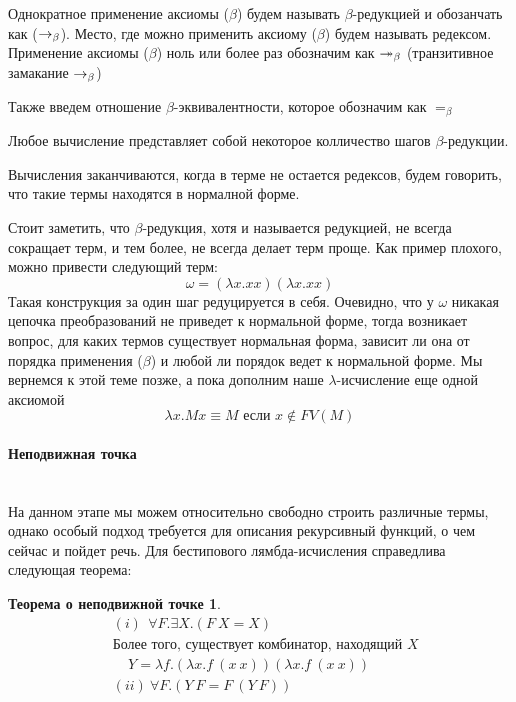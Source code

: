 \documentclass[lambda.tex]{subfiles}
\begin{document}
Однократное применение аксиомы ($\beta$) будем называть $\beta$-редукцией и обозанчать как ($\rightarrow_\beta$). Место, где можно применить аксиому ($\beta$) будем называть редексом. 
Применение аксиомы ($\beta$) ноль или более раз обозначим как $\twoheadrightarrow_\beta$ (транзитивное замакание $\rightarrow_\beta$)

Также введем отношение $\beta$-эквивалентности, которое обозначим как $=_\beta$

Любое вычисление представляет собой некоторое колличество шагов $\beta$-редукции.

Вычисления заканчиваются, когда в терме не остается редексов, будем говорить, что такие термы находятся в нормалной форме.

Стоит заметить, что $\beta$-редукция, хотя и называется редукцией, не всегда сокращает терм, и тем более, не всегда делает терм проще. Как пример плохого, можно привести следующий терм:
\begin{equation*}
	\omega = (\lambda x.xx)(\lambda x.xx)
\end{equation*}
Такая конструкция за один шаг редуцируется в себя. Очевидно, что у $\omega$ никакая цепочка преобразований не приведет к нормальной форме, тогда возникает вопрос, для каких термов существует нормальная форма, зависит ли она от порядка применения ($\beta$) и любой ли порядок ведет к нормальной форме. Мы вернемся к этой теме позже, а пока дополним наше $\lambda$-исчисление еще одной аксиомой
\begin{equation*}
	\lambda x.Mx \equiv M \text{ если }x \not\in FV(M) \tag{$\eta$}
\end{equation*}


\paragraph{Неподвижная точка} %
\label{par:fix point}
~\\

На данном этапе мы можем относительно свободно строить различные термы, однако особый подход требуется для описания рекурсивный функций, о чем сейчас и пойдет речь. Для бестипового лямбда-исчисления справедлива следующая теорема:
\newtheorem*{fixpoint}{Теорема о неподвижной точке}
\begin{fixpoint}
\begin{align*}
&(i)\ \ \forall F. \exists X. (F\ X = X) \\
&\text{Более того, существует комбинатор, находящий $X$}\\
&\ \ \ \ \ Y = \lambda f.(\lambda x.f\ (x\ x)) (\lambda x.f\ (x\ x))\\
&(ii)\ \forall F.(Y\ F=F\ (Y\ F))
\end{align*}
\end{fixpoint}
\end{document}
